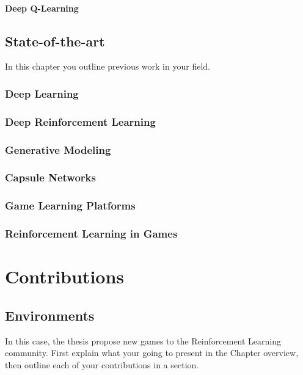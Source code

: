\documentclass{uia}
\begin{document}
\subsection{Deep Q-Learning}
\label{sec:bg:rl:dql}


\chapter{State-of-the-art}
\label{chap:sota}
In this chapter you outline previous work in your field. 

\section{Deep Learning}
\label{sec:sota:nn}

\section{Deep Reinforcement Learning}
\label{sec:sota:rl}


\section{Generative Modeling}
\label{sec:sota:gan}

\section{Capsule Networks}
\label{sec:sota:capsnet}

\section{Game Learning Platforms}
\label{sec:sota:gameenv}

\section{Reinforcement Learning in Games}
\label{sec:sota:games}


\part{Contributions}

\chapter{Environments}
\label{chap:env}
In this case, the thesis propose new games to the Reinforcement Learning community. First explain what your going to present in the Chapter overview, then outline each of your contributions in a section.
\end{document}
